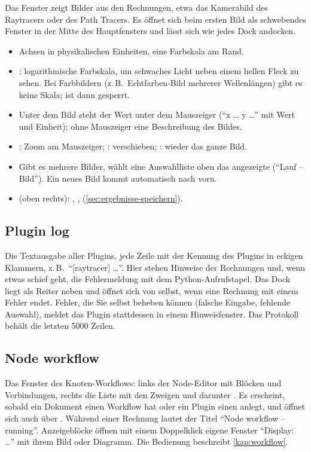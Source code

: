 Das Fenster  zeigt Bilder aus den Rechnungen, etwa das Kamerabild des Raytracers
oder des Path Tracers. Es öffnet sich beim ersten Bild als schwebendes Fenster in der Mitte des
Hauptfensters und lässt sich wie jedes Dock andocken.

\begin{itemize}
  \item Achsen in physikalischen Einheiten, eine Farbskala am Rand.
  \item {}: logarithmische Farbskala, um schwaches Licht neben einem hellen Fleck zu
    sehen. Bei Farbbildern (z.\,B.\ Echtfarben-Bild mehrerer Wellenlängen) gibt es keine
    Skala;  ist dann gesperrt.
  \item Unter dem Bild steht der Wert unter dem Mauszeiger (\enquote{x \dots{} y \dots{}} mit
    Wert und Einheit); ohne Mauszeiger eine Beschreibung des Bildes.
  \item {}: Zoom am Mauszeiger; :
    verschieben; : wieder das ganze Bild.
  \item Gibt es mehrere Bilder, wählt eine Auswahlliste oben das angezeigte (\enquote{Lauf --
    Bild}). Ein neues Bild kommt automatisch nach vorn.
  \item {} (oben rechts): , ,
     (\autoref{sec:ergebnisse-speichern}).
\end{itemize}

\subsection{Plugin log}

Die Textausgabe aller Plugins, jede Zeile mit der Kennung des Plugins in eckigen Klammern,
z.\,B.\ \enquote{[raytracer] \dots}. Hier stehen Hinweise der Rechnungen und, wenn etwas schief
geht, die Fehlermeldung mit dem Python-Aufrufstapel. Das Dock liegt als Reiter neben
 und öffnet sich von selbst, wenn eine Rechnung mit einem Fehler endet. Fehler, die
Sie selbst beheben können (falsche Eingabe, fehlende Auswahl), meldet das Plugin stattdessen
in einem Hinweisfenster. Das Protokoll behält die letzten 5000 Zeilen.

\subsection{Node workflow}

Das Fenster des Knoten-Workflows: links der Node-Editor mit Blöcken und Verbindungen, rechts
die Liste  mit den Zweigen und darunter . Es erscheint, sobald ein
Dokument einen Workflow hat oder ein Plugin einen anlegt, und öffnet sich auch über
. Während einer Rechnung lautet der Titel \enquote{Node workflow --
running}. Anzeigeblöcke öffnen mit einem Doppelklick eigene Fenster \enquote{Display: \dots}
mit ihrem Bild oder Diagramm. Die Bedienung beschreibt \autoref{kap:workflow}.

